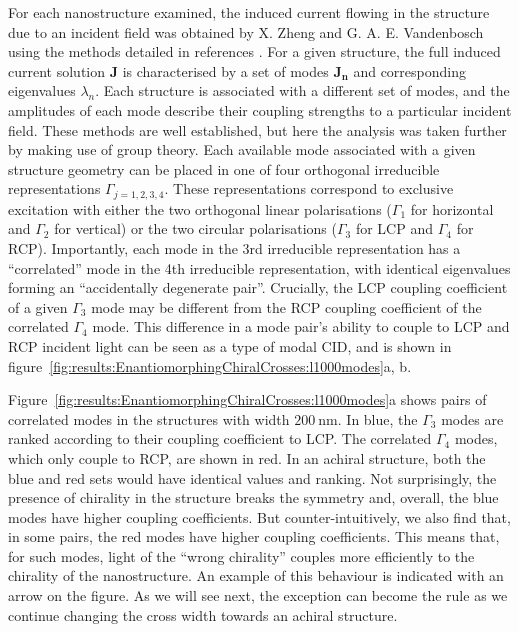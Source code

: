 For each nanostructure examined, the induced current flowing in the structure due to an incident field was obtained by X. Zheng and G. A. E. Vandenbosch using the methods detailed in references \cite{Collins2018, Zheng2012}. For a given structure, the full induced current solution $\mathbf{J}$ is characterised by a set of modes $\mathbf{J_n}$ and corresponding eigenvalues $\lambda_{n}$. Each structure is associated with a different set of modes, and the amplitudes of each mode describe their coupling strengths to a particular incident field.
These methods are well established, but here the analysis was taken further by making use of group theory. Each available mode associated with a given structure geometry can be placed in one of four orthogonal irreducible representations $\Gamma _{j = 1,2,3,4}$. These representations correspond to exclusive excitation with either the two orthogonal linear polarisations ($\Gamma _{1}$ for horizontal and $\Gamma _{2}$ for vertical) or the two circular polarisations ($\Gamma _{3}$ for LCP and $\Gamma _{4}$ for RCP). 
Importantly, each mode in the 3rd irreducible representation has a ``correlated'' mode in the 4th irreducible representation, with identical eigenvalues forming an ``accidentally degenerate pair''. 
Crucially, the LCP coupling coefficient of a given $\Gamma _{3}$ mode may be different from the RCP coupling coefficient of the correlated $\Gamma _{4}$ mode. 
This difference in a mode pair's ability to couple to LCP and RCP incident light can be seen as a type of modal CID, and is shown in figure~\ref{fig:results:EnantiomorphingChiralCrosses:l1000modes}a, b. 

Figure~\ref{fig:results:EnantiomorphingChiralCrosses:l1000modes}a shows pairs of correlated modes in the structures with width $\SI{200}{\nano\m}$. In blue, the $\Gamma _{3}$ modes are ranked according to their coupling coefficient to LCP. The correlated $\Gamma _{4}$ modes, which only couple to RCP, are shown in red. In an achiral structure, both the blue and red sets would have identical values and ranking. Not surprisingly, the presence of chirality in the structure breaks the symmetry and, overall, the blue modes have higher coupling coefficients. 
But counter-intuitively, we also find that, in some pairs, the red modes have higher coupling coefficients. This means that, for such modes, light of the ``wrong chirality'' couples more efficiently to the chirality of the nanostructure. An example of this behaviour is indicated with an arrow on the figure. As we will see next, the exception can become the rule as we continue changing the cross width towards an achiral structure.

